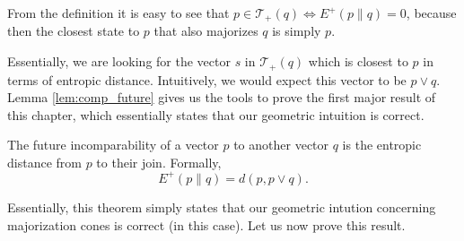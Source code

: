 \begin{remark}
    From the definition it is easy to see that $p \in \mathcal{T}_+(q) \iff E^+(p \parallel q) = 0$, because then the closest state to $p$ that also majorizes $q$ is simply $p$.
\end{remark}

Essentially, we are looking for the vector $s$ in $\mathcal{T}_+(q)$ which is closest to $p$ in terms of entropic distance. Intuitively, we would expect this vector to be $p \vee q$. Lemma \ref{lem:comp_future} gives us the tools to prove the first major result of this chapter, which essentially states that our geometric intuition is correct.

\begin{theorem}
    The future incomparability of a vector $p$ to another vector $q$ is the entropic distance from $p$ to their join. Formally,
    \begin{equation}
        E^+ (p \parallel q) = d(p, p \vee q).
    \end{equation}
\end{theorem}

Essentially, this theorem simply states that our geometric intution concerning majorization cones is correct (in this case). Let us now prove this result.

